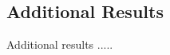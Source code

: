 \appendix
\chapter{\hspace{0.5em}} %


\label{appendix}

\section{Additional Results}
\begin{paragraph}
Additional results .....
\end{paragraph}
